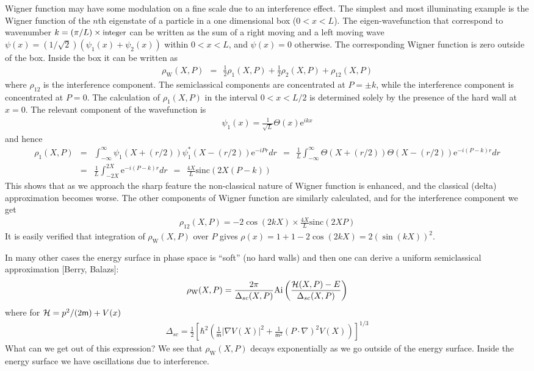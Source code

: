 \documentclass[onecolumn,fleqn]{revtex4}
\newcommand{\sinc}{\mathrm{sinc}}
\newcommand{\eexp}{\mathrm{e}^}
\newcommand{\mass}{\mathsf{m}}
\newcommand{\tbox}[1]{\text{#1}}
\newcommand{\beq}{\begin{eqnarray}}
\newcommand{\eeq}{\end{eqnarray}}
\begin{document}
Wigner function may have some modulation on 
a fine scale due to an interference effect. 
The simplest and most illuminating example 
is the Wigner function of the $n$th eigenstate 
of a particle in a one dimensional box ($0<x<L$).
The eigen-wavefunction that correspond 
to wavenumber ${k=(\pi/L)\times \mbox{\small integer}}$ 
can be written as the sum of a right moving 
and a left moving wave 
${\psi(x)= (1/\sqrt{2})(\psi_1(x)+\psi_2(x))}$
within $0<x<L$, and $\psi(x)=0$ otherwise.
The corresponding Wigner function
is zero outside of the box. Inside the box
it can be written as
\beq
\rho_{\tbox{W}}(X,P) \ \ = \ \ 
\frac{1}{2}\rho_1(X,P)+\frac{1}{2}\rho_2(X,P)+\rho_{12}(X,P)
\eeq
where $\rho_{12}$ is the interference component.
The semiclassical components are concentrated
at $P=\pm k$, while the interference component
is concentrated at $P=0$.
The calculation of $\rho_1(X,P)$ in the interval $0<x<L/2$ 
is determined solely by the presence of the hard wall at $x=0$.
The relevant component of the wavefunction is
\beq
\psi_1(x) = \frac{1}{\sqrt{L}}\Theta(x) \eexp{ikx}
\eeq
and hence
\beq
\rho_1(X,P) &=&
\int_{-\infty}^{\infty}
\psi_1(X+(r/2))\psi_1^*(X-(r/2)) \eexp{-iPr} dr
\ \ = \ \ 
\frac{1}{L}
\int_{-\infty}^{\infty}
\Theta(X+(r/2))\Theta(X-(r/2))\eexp{-i(P-k)r} dr
\nonumber \\ \ &=&
\frac{1}{L}
\int_{-2X}^{2X}\eexp{-i(P-k)r} dr
\ \ = \ \ 
\frac{4X}{L} \sinc(2X(P-k))
\eeq
This shows that as we approach the sharp feature
the non-classical nature of Wigner function
is enhanced, and the classical (delta) approximation
becomes worse. The other components of Wigner function
are similarly calculated,
and for the interference component we get
\beq
\rho_{12}(X,P) =-2\cos(2kX) \times \frac{4X}{L} \sinc(2XP)
\eeq
It is easily verified that integration of $\rho_{\tbox{W}}(X,P)$
over $P$ gives $\rho(x)=1+1-2\cos(2kX) = 2(\sin(kX))^2$.



In many other cases the energy surface in phase space 
is ``soft'' (no hard walls) and then one can derive a 
uniform semiclassical approximation [Berry, Balazs]:  
\beq
\rho_{\tbox{W}}(X,P) = \frac{2\pi}{\Delta_{sc}(X,P)}\mathrm{Ai}
\left(\frac{{\cal H}(X,P)-E}{\Delta_{sc}(X,P)}\right)
\eeq
where for ${\cal H}=p^2/(2\mass)+V(x)$ 
\beq
\Delta_{sc} = \frac{1}{2}\left[
\hbar^2 \left(\frac{1}{\mass}|\nabla V(X)|^2
+\frac{1}{\mass^2} (P\cdot \nabla)^2 V(X)\right)
\right]^{1/3}
\eeq
What can we get out of this expression? 
We see that $\rho_{\tbox{W}}(X,P)$ decays 
exponentially as we go outside of the 
energy surface. Inside the energy surface 
we have oscillations due to interference.
 
\end{document}
